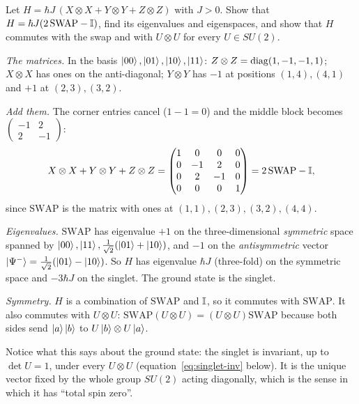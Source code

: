 \begin{example}\label{ex:symmetric-H}
  Let $H=\hbar J\,(X\otimes X+Y\otimes Y+Z\otimes Z)$ with $J>0$. Show that $H=\hbar J(2\,\mathrm{SWAP}-\mathbb{I})$, find its eigenvalues and eigenspaces, and show that $H$ commutes with the swap and with $U\otimes U$ for every $U\in SU(2)$.
\end{example}
\begin{solution}
  \begin{steps}
    \item \emph{The matrices.} In the basis $\left|00\right\rangle,\left|01\right\rangle,\left|10\right\rangle,\left|11\right\rangle$: $Z\otimes Z=\operatorname{diag}(1,-1,-1,1)$; $X\otimes X$ has ones on the anti-diagonal; $Y\otimes Y$ has $-1$ at positions $(1,4),(4,1)$ and $+1$ at $(2,3),(3,2)$.
    \item \emph{Add them.} The corner entries cancel ($1-1=0$) and the middle block becomes $\begin{pmatrix}-1&2\\2&-1\end{pmatrix}$:
      \[
        X\otimes X+Y\otimes Y+Z\otimes Z=\begin{pmatrix}1&0&0&0\\0&-1&2&0\\0&2&-1&0\\0&0&0&1\end{pmatrix}=2\,\mathrm{SWAP}-\mathbb{I},
      \]
      since $\mathrm{SWAP}$ is the matrix with ones at $(1,1),(2,3),(3,2),(4,4)$.
    \item \emph{Eigenvalues.} $\mathrm{SWAP}$ has eigenvalue $+1$ on the three-dimensional \emph{symmetric} space spanned by $\left|00\right\rangle,\left|11\right\rangle,\frac1{\sqrt2}(\left|01\right\rangle+\left|10\right\rangle)$, and $-1$ on the \emph{antisymmetric} vector $\left|\Psi^-\right\rangle=\frac1{\sqrt2}(\left|01\right\rangle-\left|10\right\rangle)$. So $H$ has eigenvalue $\hbar J$ (three-fold) on the symmetric space and $-3\hbar J$ on the singlet. The ground state is the singlet.
    \item \emph{Symmetry.} $H$ is a combination of $\mathrm{SWAP}$ and $\mathbb{I}$, so it commutes with $\mathrm{SWAP}$. It also commutes with $U\otimes U$: $\mathrm{SWAP}(U\otimes U)=(U\otimes U)\mathrm{SWAP}$ because both sides send $\left|a\right\rangle\left|b\right\rangle$ to $U\left|b\right\rangle\otimes U\left|a\right\rangle$.
  \end{steps}
  Notice what this says about the ground state: the singlet is invariant, up to $\det U=1$, under every $U\otimes U$ (equation~\eqref{eq:singlet-inv} below). It is the unique vector fixed by the whole group $SU(2)$ acting diagonally, which is the sense in which it has ``total spin zero''.
\end{solution}

